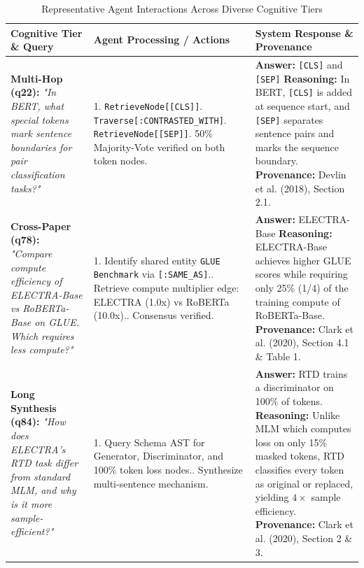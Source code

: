 \begin{table}[h]
\centering
\caption{Representative Agent Interactions Across Diverse Cognitive Tiers}
\label{tab:agent_interaction}
\small
\begin{tabular}{p{3.2cm}p{4.8cm}p{6.0cm}}
\toprule
\textbf{Cognitive Tier \& Query} & \textbf{Agent Processing / Actions} & \textbf{System Response \& Provenance} \\
\midrule
\textbf{Multi-Hop (q22):}\newline
\textit{"In BERT, what special tokens mark sentence boundaries for pair classification tasks?"} &
1. \texttt{RetrieveNode[[CLS]]}\newline
2. \texttt{Traverse[:CONTRASTED\_WITH]}\newline
3. \texttt{RetrieveNode[[SEP]]}\newline
4. 50\% Majority-Vote verified on both token nodes. &
\textbf{Answer:} \texttt{[CLS]} and \texttt{[SEP]}\newline
\textbf{Reasoning:} In BERT, \texttt{[CLS]} is added at sequence start, and \texttt{[SEP]} separates sentence pairs and marks the sequence boundary.\newline
\textbf{Provenance:} Devlin et al. (2018), Section 2.1. \\
\midrule
\textbf{Cross-Paper (q78):}\newline
\textit{"Compare compute efficiency of ELECTRA-Base vs RoBERTa-Base on GLUE. Which requires less compute?"} &
1. Identify shared entity \texttt{GLUE Benchmark} via \texttt{[:SAME\_AS]}.\newline
2. Retrieve compute multiplier edge: ELECTRA (1.0x) vs RoBERTa (10.0x).\newline
3. Consensus verified. &
\textbf{Answer:} ELECTRA-Base\newline
\textbf{Reasoning:} ELECTRA-Base achieves higher GLUE scores while requiring only 25\% (1/4) of the training compute of RoBERTa-Base.\newline
\textbf{Provenance:} Clark et al. (2020), Section 4.1 \& Table 1. \\
\midrule
\textbf{Long Synthesis (q84):}\newline
\textit{"How does ELECTRA's RTD task differ from standard MLM, and why is it more sample-efficient?"} &
1. Query Schema AST for Generator, Discriminator, and 100\% token loss nodes.\newline
2. Synthesize multi-sentence mechanism. &
\textbf{Answer:} RTD trains a discriminator on 100\% of tokens.\newline
\textbf{Reasoning:} Unlike MLM which computes loss on only 15\% masked tokens, RTD classifies every token as original or replaced, yielding $4\times$ sample efficiency.\newline
\textbf{Provenance:} Clark et al. (2020), Section 2 \& 3. \\
\bottomrule
\end{tabular}
\end{table}

